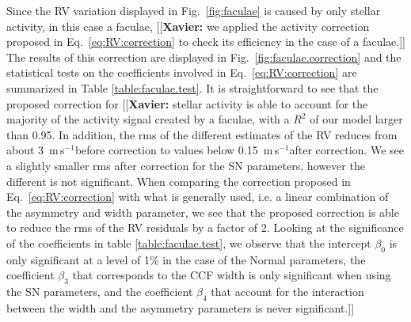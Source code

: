\documentclass[11pt, oneside]{article}
\def\ms{\hbox{\,m\,s$^{-1}$}}         %
\newcommand{\xavier}[1]{{\color{blue}[[\textbf{Xavier: }#1]]}}
\begin{document}
Since the RV variation displayed in Fig.~\ref{fig:faculae} is caused by only stellar activity, in this case a faculae, \xavier{we applied the activity correction proposed in Eq.~\ref{eq:RV:correction} to check its efficiency in the case of a faculae.} The results of this correction are displayed in Fig.~\ref{fig:faculae.correction} and the statistical tests on the coefficients involved in Eq.~\ref{eq:RV:correction} are summarized in Table \ref{table:faculae.test}. 
It is straightforward to see that the proposed correction for \xavier{stellar activity is able to account for the majority of the activity signal created by a faculae, with a $R^2$ of our model larger than 0.95. In addition, the rms of the different estimates of the RV reduces from about 3 \ms before correction to values below 0.15 \ms after correction.
We see a slightly smaller rms after correction for the SN parameters, however the different is not significant. When comparing the correction proposed in Eq.~\ref{eq:RV:correction} with what is generally used, i.e. a linear combination of the asymmetry and width parameter, we see that the proposed correction is able to reduce the rms of the RV residuals by a factor of 2. Looking at the significance of the coefficients in table \ref{table:faculae.test}, we observe that the intercept $\beta_0$ is only significant at a level of 1\% in the case of the Normal parameters, the coefficient $\beta_3$ that corresponds to the CCF width is only significant when using the SN parameters, and the coefficient $\beta_4$ that account for the interaction between the width and the asymmetry parameters is never significant.}
\end{document}
